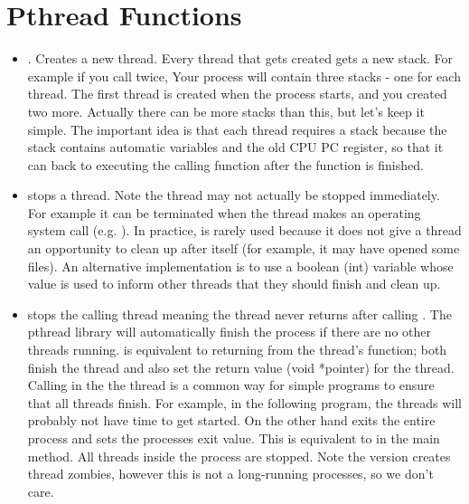 \section{Pthread Functions}\label{more-pthread-functions}

\begin{itemize}
\item {}.
Creates a new thread.
Every thread that gets created gets a new stack.
For example if you call  twice, Your process will contain three stacks - one for each thread.
The first thread is created when the process starts, and you created two more.
Actually there can be more stacks than this, but let's keep it simple.
The important idea is that each thread requires a stack because the stack contains automatic variables and the old CPU PC register, so that it can back to executing the calling function after the function is finished.

\item {} stops a thread.
Note the thread may not actually be stopped immediately.
For example it can be terminated when the thread makes an operating system call (e.g. ).
In practice,  is rarely used because it does not give a thread an opportunity to clean up after itself (for example, it may have opened some files).
An alternative implementation is to use a boolean (int) variable whose value is used to inform other threads that they should finish and clean up.

\item {} stops the calling thread meaning the thread never returns after calling .
The pthread library will automatically finish the process if there are no other threads running.
 is equivalent to returning from the thread's function; both finish the thread and also set the return value (void *pointer) for the thread.
Calling  in the the  thread is a common way for simple programs to ensure that all threads finish.
For example, in the following program, the  threads will probably not have time to get started.
On the other hand  exits the entire process and sets the processes exit value.
This is equivalent to  in the main method.
All threads inside the process are stopped.
Note the  version creates thread zombies, however this is not a long-running processes, so we don't care. 


\end{itemize}
